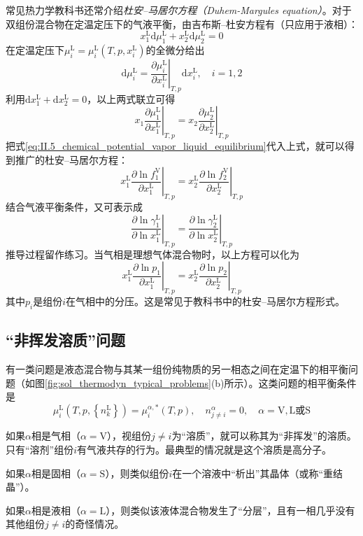\documentclass[main.tex]{subfiles}
\begin{document}
常见热力学教科书还常介绍\emph{杜安--马居尔方程（Duhem-Margules equation）}。对于双组份混合物在定温定压下的气液平衡，由吉布斯--杜安方程有（只应用于液相）：
\[x_1^\text{L}\mathrm{d}\mu_1^\text{L}+x_2^\text{L}\mathrm{d}\mu_2^\text{L}=0\]
在定温定压下$\mu_i^\text{L}=\mu_i^\text{L}\left(T,p,x_i^\text{L}\right)$的全微分给出
\[\mathrm{d}\mu_i^\text{L}=\left.\frac{\partial\mu_i^\text{L}}{\partial x_i^\text{L}}\right|_{T,p}\mathrm{d}x_i^\text{L},\quad i=1,2\]
利用$\mathrm{d}x_1^\text{L}+\mathrm{d}x_2^\text{L}=0$，以上两式联立可得
\[x_1\left.\frac{\partial\mu_1^\text{L}}{\partial x_1^\text{L}}\right|_{T,p}=x_2\left.\frac{\partial\mu_2^\text{L}}{\partial x_2^\text{L}}\right|_{T,p}\]
把式\eqref{eq:II.5_chemical_potential_vapor_liquid_equilibrium}代入上式，就可以得到推广的杜安--马居尔方程：
\[x_1^\text{L}\left.\frac{\partial\ln f_1^\text{V}}{\partial x_1^\text{L}}\right|_{T,p}=x_2^\text{L}\left.\frac{\partial\ln f_2^\text{V}}{\partial x_2^\text{L}}\right|_{T,p}\]
结合气液平衡条件，又可表示成
\[\left.\frac{\partial\ln\gamma_1^\text{L}}{\partial\ln x_1^\text{L}}\right|_{T,p}=\left.\frac{\partial\ln\gamma_2^\text{L}}{\partial\ln x_2^\text{L}}\right|_{T,p}\]
推导过程留作练习。当气相是理想气体混合物时，以上方程可以化为
\[x_1^\text{L}\left.\frac{\partial \ln p_1}{\partial x_1^\text{L}}\right|_{T,p}=x_2^\text{L}\left.\frac{\partial\ln p_2}{\partial x_2^\text{L}}\right|_{T,p}\]
其中$p_i$是组份$i$在气相中的分压。这是常见于教科书中的杜安--马居尔方程形式。

\subsection{“非挥发溶质”问题}\label{sec:II.5.3 non_volatile_solute}
有一类问题是液态混合物与其某一组份纯物质的另一相态之间在定温下的相平衡问题（如图\ref{fig:sol_thermodyn_typical_problems}(b)所示）。这类问题的相平衡条件是
\begin{equation}\label{eq:II.5_phase_eq_non_volatile}
  \mu_i^\text{L}\left(T,p,\left\{n_k^\text{L}\right\}\right)=\mu_i^{\alpha,*}\left(T,p\right),\quad n_{j\neq i}^\alpha=0,\quad \alpha=\text{V},\text{L或S}
\end{equation}

如果$\alpha$相是气相（$\alpha=\text{V}$），视组份$j\neq i$为“溶质”，就可以称其为“非挥发”的溶质。只有“溶剂”组份$i$有气液共存的行为。最典型的情况就是这个溶质是高分子。

如果$\alpha$相是固相（$\alpha=\text{S}$），则类似组份$i$在一个溶液中“析出”其晶体（或称“重结晶”）。

如果$\alpha$相是液相（$\alpha=\text{L}$），则类似该液体混合物发生了“分层”，且有一相几乎没有其他组份$j\neq i$的奇怪情况。
\end{document}
